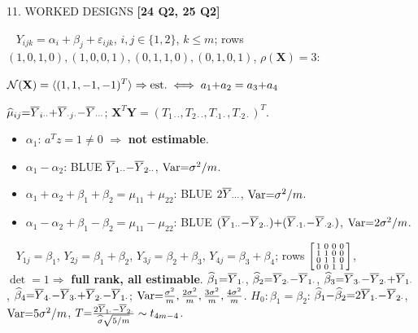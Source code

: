 \documentclass[10pt,a4paper]{article}
\newcommand{\spyq}[1]{{\tiny\color{Yellow}\textbf{[#1]}}}
\newcommand{\sect}[1]{\vspace{2pt}\noindent\colorbox{Blue!78}{\parbox{0.955\columnwidth}%
{\color{white}\bfseries\scriptsize\let\pyq\spyq\strut #1}}\vspace{1pt}\par}
\newcommand{\ssec}[1]{\textbf{\color{BrickRed}#1}\ }
\newcommand{\pyq}[1]{{\tiny\color{BrickRed}\textbf{[#1]}}}
\newcommand{\hd}[1]{\textbf{\color{ForestGreen}#1}}
\newcommand{\key}[1]{\par\vspace{0.8pt}\noindent\centerline{\adjustbox{max width=0.96\columnwidth}%
{\colorbox{Yellow!40}{$\displaystyle #1$}}}\vspace{0.8pt}\par}
\newcommand{\bY}{\mathbf{Y}}\newcommand{\bX}{\mathbf{X}}\newcommand{\bZ}{\mathbf{Z}}
\newcommand{\wh}[1]{\widehat{#1}}\newcommand{\SSE}{\mathrm{SSE}}\newcommand{\MSE}{\mathrm{MSE}}
\begin{document}
\begin{multicols}{2}
\sect{11. WORKED DESIGNS \pyq{24 Q2, 25 Q2}}
\ssec{\pyq{25 Q2}} $Y_{ijk}{=}\alpha_i{+}\beta_j{+}\varepsilon_{ijk}$, $i,j\in\{1,2\}$, $k\le m$; rows $(1,0,1,0),(1,0,0,1),(0,1,1,0),(0,1,0,1)$, $\rho(\bX){=}3$:
\key{\Nsp(\bX)=\langle(1,1,-1,-1)^T\rangle\Rightarrow\text{est.}\iff a_1{+}a_2=a_3{+}a_4}
$\wh\mu_{ij}{=}\Yb_{i\cdot\cdot}{+}\Yb_{\cdot j\cdot}{-}\Yb_{\cdots}$; $\bX^T\bY{=}(T_{1\cdot\cdot},T_{2\cdot\cdot},T_{\cdot1\cdot},T_{\cdot2\cdot})^T$.
\begin{itemize}
\item $\alpha_1$: $a^Tz{=}1\ne0$ $\Rightarrow$ \textbf{not estimable}.
\item $\alpha_1{-}\alpha_2$: BLUE $\overline{Y}_{1\cdot\cdot}{-}\overline{Y}_{2\cdot\cdot}$, $\mathrm{Var}{=}\sigma^2/m$.
\item $\alpha_1{+}\alpha_2{+}\beta_1{+}\beta_2{=}\mu_{11}{+}\mu_{22}$: BLUE $2\overline{Y}_{\cdots}$, $\mathrm{Var}{=}\sigma^2/m$.
\item $\alpha_1{-}\alpha_2{+}\beta_1{-}\beta_2{=}\mu_{11}{-}\mu_{22}$: BLUE $(\overline{Y}_{1\cdot\cdot}{-}\overline{Y}_{2\cdot\cdot}){+}(\overline{Y}_{\cdot1\cdot}{-}\overline{Y}_{\cdot2\cdot})$, $\mathrm{Var}{=}2\sigma^2/m$.
\end{itemize}
\ssec{\pyq{24 Q2}} $Y_{1j}{=}\beta_1$, $Y_{2j}{=}\beta_1{+}\beta_2$, $Y_{3j}{=}\beta_2{+}\beta_3$, $Y_{4j}{=}\beta_3{+}\beta_4$; rows $\begin{bsmallmatrix}1&0&0&0\\1&1&0&0\\0&1&1&0\\0&0&1&1\end{bsmallmatrix}$, $\det{=}1\Rightarrow$ \hd{full rank, all estimable}.
$\wh\beta_1{=}\Yb_{1\cdot}$, $\wh\beta_2{=}\Yb_{2\cdot}{-}\Yb_{1\cdot}$, $\wh\beta_3{=}\Yb_{3\cdot}{-}\Yb_{2\cdot}{+}\Yb_{1\cdot}$, $\wh\beta_4{=}\Yb_{4\cdot}{-}\Yb_{3\cdot}{+}\Yb_{2\cdot}{-}\Yb_{1\cdot}$; $\mathrm{Var}{=}\frac{\sigma^2}{m},\frac{2\sigma^2}{m},\frac{3\sigma^2}{m},\frac{4\sigma^2}{m}$.
$H_0{:}\beta_1{=}\beta_2$: $\wh\beta_1{-}\wh\beta_2{=}2\Yb_{1\cdot}{-}\Yb_{2\cdot}$, $\mathrm{Var}{=}5\sigma^2/m$, $T{=}\frac{2\Yb_{1\cdot}-\Yb_{2\cdot}}{\wh\sigma\sqrt{5/m}}\sim t_{4m-4}$.


\end{multicols}
\end{document}
